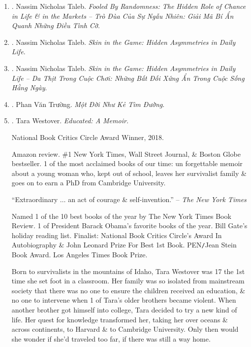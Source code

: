 \documentclass{article}
\begin{document}
\begin{enumerate}
	\item \cite{Taleb_randomness_VN}. Nassim Nicholas Taleb. {\it Fooled By Randomness: The Hidden Role of Chance in Life \& in the Markets -- Trò Đùa Của Sự Ngẫu Nhiên: Giải Mã Bí Ẩn Quanh Những Điều Tình Cờ}.\hfill{\sf[done]}
	
	\item \cite{Taleb_skin_game}. Nassim Nicholas Taleb. {\it Skin in the Game: Hidden Asymmetries in Daily Life}.
	
	\item \cite{Taleb_skin_game_VN}. Nassim Nicholas Taleb. {\it Skin in the Game: Hidden Asymmetries in Daily Life -- Da Thịt Trong Cuộc Chơi: Những Bất Đối Xứng Ẩn Trong Cuộc Sống Hằng Ngày}.\hfill{\sf[done]}
	
	\item \cite{Truong_ke_tim_duong}. Phan Văn Trường. {\it Một Đời Như Kẻ Tìm Đường}.\hfill{\sf[done]}
	
	\item \cite{Westover_educated}. {\sc Tara Westover}. {\it Educated: A Memoir.} {}
	
	National Book Critics Circle Award Winner, 2018.
	
	{\sf Amazon review.} \#1 New York Times, Wall Street Journal, \& Boston Globe bestseller. 1 of the most acclaimed books of our time: un forgettable memoir about a young woman who, kept out of school, leaves her survivalist family \& goes on to earn a PhD from Cambridge University.
	
	``Extraordinary $\ldots$ an act of courage \& self-invention.'' -- {\it The New York Times}
	
	Named 1 of the 10 best books of the year by The New York Times Book Review. 1 of President {\sc Barack Obama}'s favorite books of the year. {\sc Bill Gate}'s holiday reading list. Finalist: National Book Critics Circle's Award In Autobiography \& John Leonard Prize For Best 1st Book. PEN{\tt/}Jean Stein Book Award. Los Angeles Times Book Prize.
	
	Born to survivalists in the mountains of Idaho, {\sc Tara Westover} was 17 the 1st time she set foot in a classroom. Her family was so isolated from mainstream society that there was no one to ensure the children received an education, \& no one to intervene when 1 of {\sc Tara}'s older brothers became violent. When another brother got himself into college, {\sc Tara} decided to try a new kind of life. Her quest for knowledge transformed her, taking her over oceans \& across continents, to Harvard \& to Cambridge University. Only then would she wonder if she'd traveled too far, if there was still a way home.
	

\end{enumerate}
\end{document}
